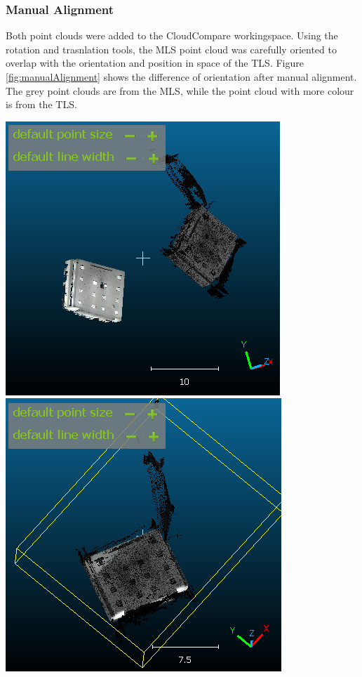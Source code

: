 \documentclass[man]{apa7}
\begin{document}
\subsubsection{Manual Alignment}
Both point clouds were added to the CloudCompare workingspace. Using the rotation and trasnlation tools, the MLS point cloud was carefully oriented to overlap with the orientation and position in space of the TLS. Figure \ref{fig:manualAlignment} shows the difference of orientation after manual alignment. The grey point clouds are from the MLS, while the point cloud with more colour is from the TLS.

\begin{minipage}{\linewidth}
  \includegraphics[height=\textheight/3,width=\textwidth/2]{figures/InitialAlignments.png}
  \includegraphics[height=\textheight/3,width=\textwidth/2]{figures/FinalAlignments.png}

\end{minipage}
\end{document}
